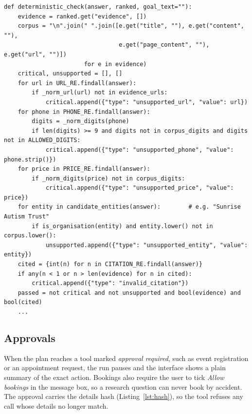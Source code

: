 \documentclass[11pt,a4paper]{article}
\newcommand{\code}[1]{\texttt{#1}}
\begin{document}
\par\noindent\begin{minipage}{\linewidth}\begin{lstlisting}[caption={Deterministic grounding check: specific facts must appear in the retrieved evidence (\code{agent/research/verification.py}, shortened).},label={lst:verify}]
def deterministic_check(answer, ranked, goal_text=""):
    evidence = ranked.get("evidence", [])
    corpus = "\n".join(" ".join([e.get("title", ""), e.get("content", ""),
                                 e.get("page_content", ""), e.get("url", "")])
                       for e in evidence)
    critical, unsupported = [], []
    for url in URL_RE.findall(answer):
        if _norm_url(url) not in evidence_urls:
            critical.append({"type": "unsupported_url", "value": url})
    for phone in PHONE_RE.findall(answer):
        digits = _norm_digits(phone)
        if len(digits) >= 9 and digits not in corpus_digits and digits not in ALLOWED_DIGITS:
            critical.append({"type": "unsupported_phone", "value": phone.strip()})
    for price in PRICE_RE.findall(answer):
        if _norm_digits(price) not in corpus_digits:
            critical.append({"type": "unsupported_price", "value": price})
    for entity in candidate_entities(answer):        # e.g. "Sunrise Autism Trust"
        if is_organisation(entity) and entity.lower() not in corpus.lower():
            unsupported.append({"type": "unsupported_entity", "value": entity})
    cited = {int(n) for n in CITATION_RE.findall(answer)}
    if any(n < 1 or n > len(evidence) for n in cited):
        critical.append({"type": "invalid_citation"})
    passed = not critical and not unsupported and bool(evidence) and bool(cited)
    ...
\end{lstlisting}\end{minipage}\par

\subsection{Approvals}
When the plan reaches a tool marked \emph{approval required}, such as event registration or an appointment
request, the run pauses and the interface shows a plain summary of the exact action. Bookings also
require the user to tick \emph{Allow bookings} in the message box, so a research question can never
book by accident. The approval carries the details hash (Listing~\ref{lst:hash}), so the tool refuses
any call whose details no longer match.
\end{document}
